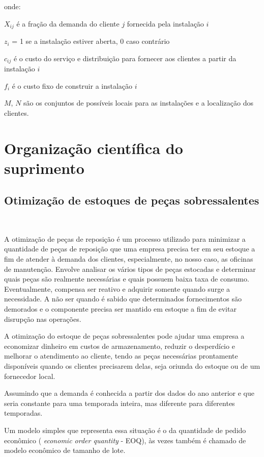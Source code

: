 \documentclass{abntex2}
\begin{document}
\begin{sloppypar}
onde:

$X_{ij}$ é a fração da demanda do cliente $j$ fornecida pela instalação $i$

$z_i$ = 1 se a instalação estiver aberta, 0 caso contrário

$c_{ij}$ é o custo do serviço e distribuição para fornecer aos clientes a partir da instalação $i$

$f_i$ é o custo fixo de construir a instalação $i$

$M$, $N$ são os conjuntos de possíveis locais para as instalações e a localização dos clientes.


\section{Organização científica do suprimento}


\subsection{Otimização de estoques de peças sobressalentes}\

A otimização de peças de reposição é um processo utilizado para minimizar a quantidade de peças de reposição que uma empresa precisa ter em seu estoque a fim de atender à demanda dos clientes, especialmente, no nosso caso, as oficinas de manutenção. Envolve analisar os vários tipos de peças estocadas e determinar quais peças são realmente necessárias e quais possuem baixa taxa de consumo. Eventualmente, compensa ser reativo e adquirir somente quando surge a necessidade. A não ser quando é sabido que determinados fornecimentos são demorados e o componente precisa ser mantido em estoque a fim de evitar disrupção nas operações.

A otimização do estoque de peças sobressalentes pode ajudar uma empresa a economizar dinheiro em custos de armazenamento, reduzir o desperdício e melhorar o atendimento ao cliente, tendo as peças necessárias prontamente disponíveis quando os clientes precisarem delas, seja oriunda do estoque ou de um fornecedor local.

Assumindo que a demanda é conhecida a partir dos dados do ano anterior e que seria constante para uma temporada inteira, mas diferente para diferentes temporadas.

Um modelo simples que representa essa situação é o da quantidade de pedido econômico (\textit{ economic order quantity} - EOQ), às vezes também é chamado de modelo econômico de tamanho de lote.


\end{sloppypar}
\end{document}
